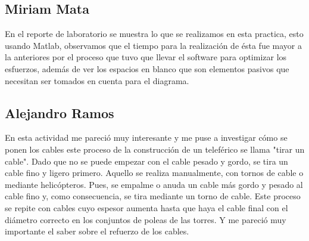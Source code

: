 \documentclass{article}
\begin{document}
\subsection{Miriam  Mata}
En el reporte de laboratorio se muestra lo que se realizamos en esta practica, esto usando Matlab, observamos que el tiempo para la realización de ésta fue mayor a la anteriores por el proceso que tuvo que llevar el software para optimizar los esfuerzos, además de ver los espacios en blanco que son elementos pasivos que necesitan ser tomados en cuenta para el diagrama.
\subsection{Alejandro Ramos}
En esta actividad me pareció muy interesante y me puse a investigar cómo se ponen los cables este proceso de la construcción de un teleférico se llama "tirar un cable". Dado que no se puede empezar con el cable pesado y gordo, se tira un cable fino y ligero primero. Aquello se realiza manualmente, con tornos de cable o mediante helicópteros. Pues, se empalme o anuda un cable más gordo y pesado al cable fino y, como consecuencia, se tira mediante un torno de cable. Este proceso se repite con cables cuyo espesor aumenta hasta que haya el cable final con el diámetro correcto en los conjuntos de poleas de las torres. Y me pareció muy importante el saber sobre el refuerzo de los cables.


\end{document}
